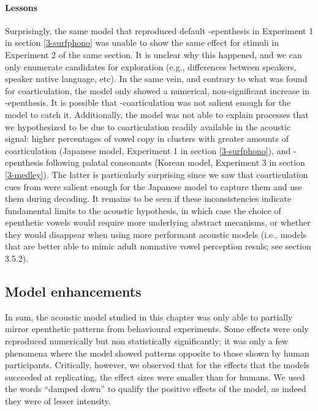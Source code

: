 {\paragraph{Lessons}
Surprisingly, the same model that reproduced default -epenthesis in Experiment 1 in section \ref{3-surfphono} was unable to show the same effect for stimuli in Experiment 2 of the same section. It is unclear why this happened, and we can only enumerate candidates for exploration (e.g., differences between speakers, speaker native language, etc). In the same vein, and contrary to what was found for  coarticulation, the model only showed a numerical, non-significant increase in -epenthesis. It is possible that -coarticulation was not salient enough for the model to catch it. Additionally, the model was not able to explain processes that we hypothesized to be due to coarticulation readily available in the acoustic signal: higher percentages of vowel copy in clusters with greater amounts of coarticulation (Japanese model, Experiment 1 in section \ref{3-surfphono}), and -epenthesis following palatal consonants (Korean model, Experiment 3 in section \ref{3-medley}). The latter is particularly surprising since we saw that coarticulation cues from  were salient enough for the Japanese model to capture them and use them during decoding. It remains to be seen if these inconsistencies indicate fundamental limits to the acoustic hypothesis, in which case the choice of epenthetic vowels would require more underlying abstract mecanisms, or whether they would disappear when using more performant acoustic models (i.e., models that are better able to mimic adult nonnative vowel perception resuls; see section 3.5.2).  

\subsection{Model enhancements}
In sum, the acoustic model studied in this chapter was only able to partially mirror epenthetic patterns from behavioural experiments. Some effects were only reproduced numerically but non statistically significantly; it was only a few phenomena where the model showed patterns opposite to those shown by human participants. Critically, however, we observed that for the effects that the models succeeded at replicating, the effect sizes were smaller than for humans. We used the words ``damped down'' to qualify the positive effects of the model, as indeed they were of lesser intensity.

}

